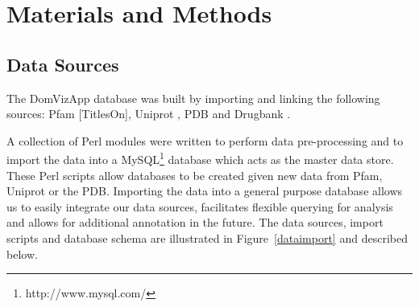 \section{Materials and Methods}
% 


\subsection{Data Sources}

The DomVizApp database was built by importing and linking the following sources: Pfam \cite{pfamdb}[TitlesOn], Uniprot \cite{uniprot}, PDB \cite{pdb} and Drugbank \cite{drugbank}.

A collection of Perl modules were written to perform data pre-processing and to import the data into a MySQL\footnote{http://www.mysql.com/} database which acts as the master data store. These Perl scripts allow databases to be created given new data from Pfam, Uniprot or the PDB. Importing the data into a general purpose database allows us to easily integrate our data sources, facilitates flexible querying for analysis and allows for additional annotation in the future. The data sources, import scripts and database schema are illustrated in Figure~\ref{dataimport} and described below.  

